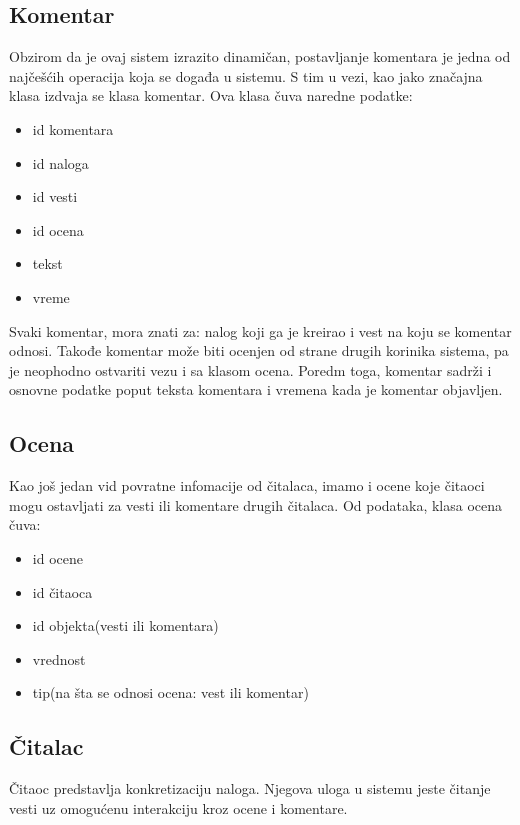 \documentclass{article}
\begin{document}
\subsection{Komentar}

Obzirom da je ovaj sistem izrazito dinamičan, postavljanje komentara je jedna od najčešćih operacija koja se događa u sistemu. S tim u vezi, kao jako značajna klasa izdvaja se klasa komentar. Ova klasa čuva naredne podatke:

\begin{itemize}
    \item id komentara
    \item id naloga
    \item id vesti
    \item id ocena
    \item tekst
    \item vreme
\end{itemize}

Svaki komentar, mora znati za: nalog koji ga je kreirao i vest na koju se komentar odnosi. Takođe komentar može biti ocenjen od strane drugih korinika sistema, pa je neophodno ostvariti vezu i sa klasom ocena. Poredm toga, komentar sadrži i osnovne podatke poput teksta komentara i vremena kada je komentar objavljen.   

\subsection{Ocena}

Kao još jedan vid povratne infomacije od čitalaca, imamo i ocene koje čitaoci mogu ostavljati za vesti ili komentare drugih čitalaca. Od podataka, klasa ocena čuva:

\begin{itemize}
    \item id ocene
    \item id čitaoca
    \item id objekta(vesti ili komentara)
    \item vrednost
    \item tip(na šta se odnosi ocena: vest ili komentar)
\end{itemize}

\subsection{Čitalac}

Čitaoc predstavlja konkretizaciju naloga. Njegova uloga u sistemu jeste čitanje vesti uz omogućenu interakciju kroz ocene i komentare. 
\end{document}
